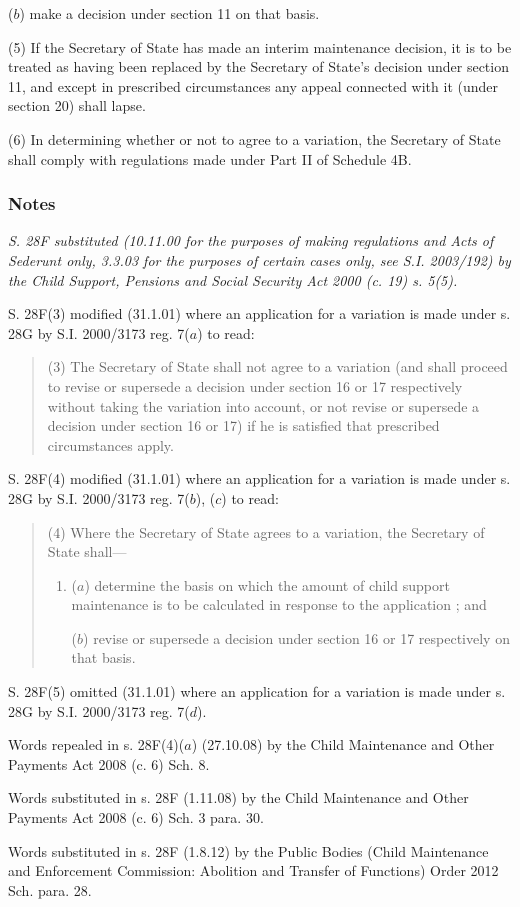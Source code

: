 \documentclass[a4paper]{article}
\newcommand\amendment[1]{\subsubsection*{Notes}{\itshape\frenchspacing\footnotesize #1 \par}}
\begin{document}
{\begin{enumerate}
($b$) make a decision under section 11 on that basis.
\end{enumerate}

(5) If the Secretary of State has made an interim maintenance decision, it is to be treated as having been replaced by the Secretary of State’s decision under section 11, and except in prescribed circumstances any appeal connected with it (under section 20) shall lapse.

(6) In determining whether or not to agree to a variation, the Secretary of State shall comply with regulations made under Part II of Schedule 4B.

\amendment{
S. 28F substituted (10.11.00 for the purposes of making regulations and Acts of Sederunt only, 3.3.03 for the purposes of certain cases only, see S.I. 2003/192) by the Child Support, Pensions and Social Security Act 2000 (c. 19) s. 5(5).

S. 28F(3) modified (31.1.01) where an application for a variation is made under s. 28G by S.I. 2000/3173 reg. 7($a$) to read:

\begin{quotation}
(3) The Secretary of State shall not agree to a variation (and shall proceed to revise or supersede a decision under section 16 or 17 respectively without taking the variation into account, or not revise or supersede a decision under section 16 or 17) if he is satisfied that prescribed circumstances apply.
\end{quotation}

S. 28F(4) modified (31.1.01) where an application for a variation is made under s. 28G by S.I. 2000/3173 reg. 7($b$), ($c$) to read:

\begin{quotation}
(4) Where the Secretary of State agrees to a variation, the Secretary of State shall---
\begin{enumerate}\item[]
($a$) determine the basis on which the amount of child support maintenance is to be calculated in response to the application%
; and

($b$) revise or supersede a decision under section 16 or 17 respectively on that basis.
\end{enumerate}
\end{quotation}

S. 28F(5) omitted (31.1.01) where an application for a variation is made under s. 28G by S.I. 2000/3173 reg. 7($d$).

Words repealed in s. 28F(4)($a$) (27.10.08) by the Child Maintenance and Other Payments Act 2008 (c. 6) Sch. 8.

Words substituted in s. 28F (1.11.08) by the Child Maintenance and Other Payments Act 2008 (c. 6) Sch. 3 para. 30.

Words substituted in s. 28F (1.8.12) by the Public Bodies (Child Maintenance and Enforcement Commission: Abolition and Transfer of Functions) Order 2012 Sch. para. 28.
}

}
\end{document}
